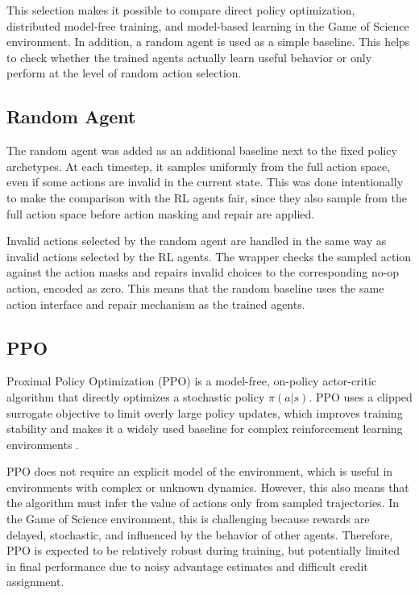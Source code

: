\documentclass[english,bachelor]{hsluthesis}
\begin{document}
This selection makes it possible to compare direct policy optimization, distributed model-free training, and model-based learning in the Game of Science environment. In addition, a random agent is used as a simple baseline. This helps to check whether the trained agents actually learn useful behavior or only perform at the level of random action selection.

\subsection{Random Agent}

The random agent was added as an additional baseline next to the fixed policy archetypes. At each timestep, it samples uniformly from the full action space, even if some actions are invalid in the current state. This was done intentionally to make the comparison with the RL agents fair, since they also sample from the full action space before action masking and repair are applied.

Invalid actions selected by the random agent are handled in the same way as invalid actions selected by the RL agents. The wrapper checks the sampled action against the action masks and repairs invalid choices to the corresponding no-op action, encoded as zero. This means that the random baseline uses the same action interface and repair mechanism as the trained agents.

\subsection{PPO}

Proximal Policy Optimization (PPO) is a model-free, on-policy actor-critic algorithm that directly optimizes a stochastic policy $\pi(a|s)$. PPO uses a clipped surrogate objective to limit overly large policy updates, which improves training stability and makes it a widely used baseline for complex reinforcement learning environments \cite{schulman2017proximalpolicyoptimizationalgorithms}.

PPO does not require an explicit model of the environment, which is useful in environments with complex or unknown dynamics. However, this also means that the algorithm must infer the value of actions only from sampled trajectories. In the Game of Science environment, this is challenging because rewards are delayed, stochastic, and influenced by the behavior of other agents. Therefore, PPO is expected to be relatively robust during training, but potentially limited in final performance due to noisy advantage estimates and difficult credit assignment.
\end{document}
